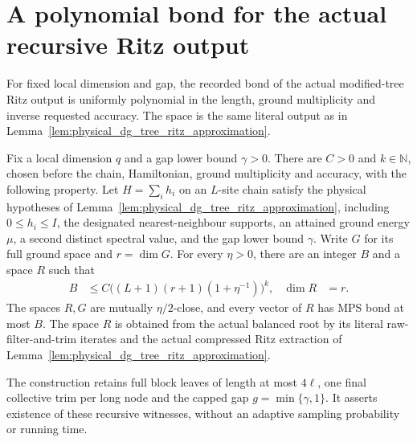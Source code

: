 \section{A polynomial bond for the actual recursive Ritz output}
\label{sec:physical_tree_polynomial}

For fixed local dimension and gap, the recorded bond of the actual
modified-tree Ritz output is uniformly polynomial in the length, ground
multiplicity and inverse requested accuracy. The space is the same
literal output as in Lemma~\ref{lem:physical_dg_tree_ritz_approximation}.

\begin{lemma}
    \label{lem:physical_tree_ritz_polynomial}
    \leanok
    Fix a local dimension $q$ and a gap lower bound $\gamma>0$.
    There are $C>0$ and $k\in\mathbb N$, chosen before the chain,
    Hamiltonian, ground multiplicity and accuracy, with the following
    property. Let $H=\sum_i h_i$ on an $L$-site chain satisfy the
    physical hypotheses of
    Lemma~\ref{lem:physical_dg_tree_ritz_approximation}, including
    $0\leq h_i\leq I$, the designated nearest-neighbour supports,
    an attained ground energy $\mu$, a second distinct spectral value,
    and the gap lower bound $\gamma$. Write $G$ for its full ground
    space and $r=\dim G$.
    For every $\eta>0$, there are an integer $B$ and a space $R$ such that
    \begin{align}
        B      & \leq C\bigl((L+1)(r+1)(1+\eta^{-1})\bigr)^k, &
        \dim R & =r.
    \end{align}
    The spaces $R,G$ are mutually $\eta/2$-close, and every vector
    of $R$ has MPS bond at most $B$.
    The space $R$ is obtained from the actual balanced root by its
    literal raw-filter-and-trim iterates and the actual compressed
    Ritz extraction of
    Lemma~\ref{lem:physical_dg_tree_ritz_approximation}.

    The construction retains full block leaves of length at most
    $4\ell$, one final collective trim per long node and the capped
    gap $g=\min\{\gamma,1\}$. It asserts existence of these recursive
    witnesses, without an adaptive sampling probability or running time.
\end{lemma}
